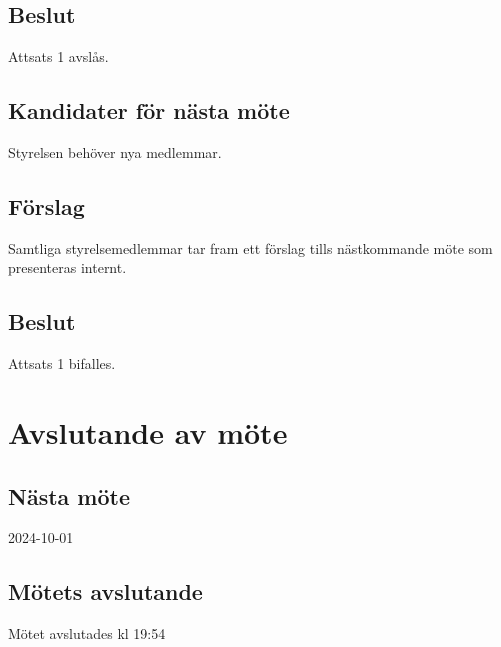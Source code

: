 \documentclass[protokoll]{dvd}
\begin{document}
\subsection{Beslut}
Attsats 1 avslås.


\subsection*{Kandidater för nästa möte}
Styrelsen behöver nya medlemmar. 

\subsection{Förslag}
\begin{attsatser}
    \item Samtliga styrelsemedlemmar tar fram ett förslag tills nästkommande möte som presenteras internt.
\end{attsatser}
\subsection{Beslut}
Attsats 1 bifalles.
\newpage
\section{Avslutande av möte}

\subsection{Nästa möte}
2024-10-01

\subsection{Mötets avslutande}
Mötet avslutades kl 19:54 

\styrelsesignaturer
\end{document}
